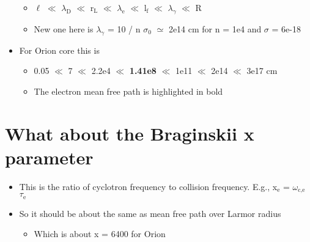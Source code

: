 \documentclass[11pt]{article}
\begin{document}
\begin{itemize}
\begin{itemize}
\item \(\ell\) \(\ll\) \(\lambda_{\text{D}}\) \(\ll\) r\(_{\text{L}}\) \(\ll\) \(\lambda_{\text{e}}\) \(\ll\) l\(_{\text{f}}\) \(\ll\) \(\lambda_{\gamma}\) \(\ll\) R
\item New one here is \(\lambda_{\gamma}\) = 10 / n \(\sigma_{\text{0}}\) \(\simeq\) 2e14 cm for n = 1e4 and \(\sigma\)  = 6e-18
\end{itemize}
\item For Orion core this is
\begin{itemize}
\item 0.05 \(\ll\) 7 \(\ll\) 2.2e4 \(\ll\) \textbf{1.41e8} \(\ll\) 1e11 \(\ll\) 2e14 \(\ll\) 3e17 cm
\item The electron mean free path is highlighted in bold
\end{itemize}
\end{itemize}
\section{What about the Braginskii x parameter}
\label{sec:orgheadline31}
\begin{itemize}
\item This is the ratio of cyclotron frequency to collision frequency. E.g., x\(_{\text{e}}\) = \(\omega_{\text{c,e}}\) \(\tau_{\text{e}}\)
\item So it should be about the same as mean free path over Larmor radius
\begin{itemize}
\item Which is about x = 6400 for Orion
\end{itemize}
\end{itemize}
\end{document}
